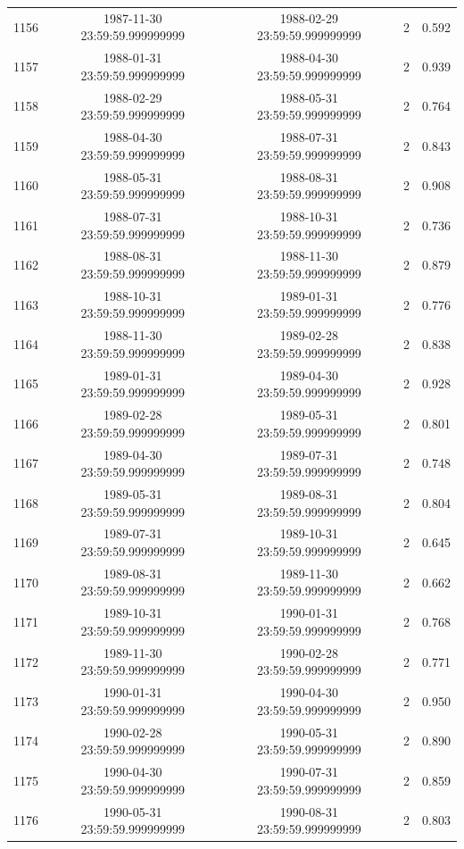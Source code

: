\begin{table}
\begin{tabular}{lcccc}
1156 & 1987-11-30 23:59:59.999999999 & 1988-02-29 23:59:59.999999999 & 2 & 0.592 \\
1157 & 1988-01-31 23:59:59.999999999 & 1988-04-30 23:59:59.999999999 & 2 & 0.939 \\
1158 & 1988-02-29 23:59:59.999999999 & 1988-05-31 23:59:59.999999999 & 2 & 0.764 \\
1159 & 1988-04-30 23:59:59.999999999 & 1988-07-31 23:59:59.999999999 & 2 & 0.843 \\
1160 & 1988-05-31 23:59:59.999999999 & 1988-08-31 23:59:59.999999999 & 2 & 0.908 \\
1161 & 1988-07-31 23:59:59.999999999 & 1988-10-31 23:59:59.999999999 & 2 & 0.736 \\
1162 & 1988-08-31 23:59:59.999999999 & 1988-11-30 23:59:59.999999999 & 2 & 0.879 \\
1163 & 1988-10-31 23:59:59.999999999 & 1989-01-31 23:59:59.999999999 & 2 & 0.776 \\
1164 & 1988-11-30 23:59:59.999999999 & 1989-02-28 23:59:59.999999999 & 2 & 0.838 \\
1165 & 1989-01-31 23:59:59.999999999 & 1989-04-30 23:59:59.999999999 & 2 & 0.928 \\
1166 & 1989-02-28 23:59:59.999999999 & 1989-05-31 23:59:59.999999999 & 2 & 0.801 \\
1167 & 1989-04-30 23:59:59.999999999 & 1989-07-31 23:59:59.999999999 & 2 & 0.748 \\
1168 & 1989-05-31 23:59:59.999999999 & 1989-08-31 23:59:59.999999999 & 2 & 0.804 \\
1169 & 1989-07-31 23:59:59.999999999 & 1989-10-31 23:59:59.999999999 & 2 & 0.645 \\
1170 & 1989-08-31 23:59:59.999999999 & 1989-11-30 23:59:59.999999999 & 2 & 0.662 \\
1171 & 1989-10-31 23:59:59.999999999 & 1990-01-31 23:59:59.999999999 & 2 & 0.768 \\
1172 & 1989-11-30 23:59:59.999999999 & 1990-02-28 23:59:59.999999999 & 2 & 0.771 \\
1173 & 1990-01-31 23:59:59.999999999 & 1990-04-30 23:59:59.999999999 & 2 & 0.950 \\
1174 & 1990-02-28 23:59:59.999999999 & 1990-05-31 23:59:59.999999999 & 2 & 0.890 \\
1175 & 1990-04-30 23:59:59.999999999 & 1990-07-31 23:59:59.999999999 & 2 & 0.859 \\
1176 & 1990-05-31 23:59:59.999999999 & 1990-08-31 23:59:59.999999999 & 2 & 0.803 \\

\end{tabular}
\end{table}
